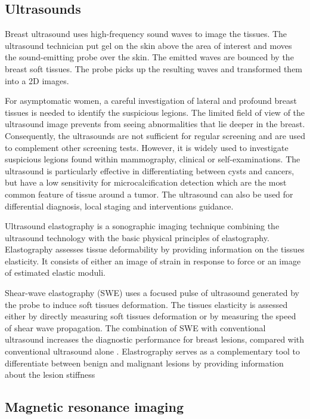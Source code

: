 \subsection{Ultrasounds}\label{subsection:ultrasound}

Breast ultrasound uses high-frequency sound waves to image the tissues. The ultrasound technician put gel on the skin above the area of interest and moves the sound-emitting probe over the skin. The emitted waves are bounced by the breast soft tissues. The probe picks up the resulting waves and transformed them into a 2D images. 

For asymptomatic women, a careful investigation of lateral and profound breast tissues is needed to identify the suspicious legions. The limited field of view of the ultrasound image prevents from seeing abnormalities that lie deeper in the breast. Consequently, the ultrasounds are not sufficient for regular screening and are used to complement other screening tests. However, it is widely used to investigate suspicious legions found within mammography, clinical or self-examinations. The ultrasound is particularly effective in differentiating between cysts and cancers, but have a low sensitivity for microcalcification detection which are the most common feature of tissue around a tumor.
The ultrasound can also be used for differential diagnosis, local staging and interventions guidance.

Ultrasound elastography is a sonographic imaging technique combining the ultrasound technology with the basic physical principles of elastography. Elastography assesses tissue deformability by providing information on the tissues elasticity. It consists of either an image of strain in response to force or an image of estimated elastic moduli.

Shear-wave elastography (SWE) uses a focused pulse of ultrasound generated by the probe to induce soft tissues deformation. The tissues elasticity is assessed either by directly measuring soft tissues deformation or by measuring the speed of shear wave propagation. The combination of SWE with conventional ultrasound
increases the diagnostic performance for breast lesions, compared
with conventional ultrasound alone \citep{youk_shear_2017}.  Elastrography serves as a complementary tool to differentiate between benign and malignant lesions by providing information about the lesion stiffness\citep{itoh_breast_2006,olgun_use_2014}
 
\subsection{Magnetic resonance imaging}\label{subsection:mri}

